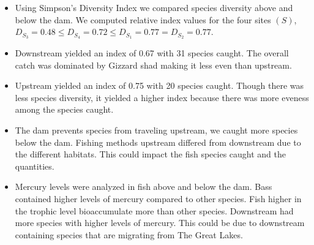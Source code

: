 \documentclass[b0paper,margin=1cm,landscape]{baposter}
\begin{document}
\begin{poster}
{  \begin{itemize} \normalsize 
    \item Using Simpson's Diversity Index we compared species diversity above and below the dam. 
    We computed relative index values for the four sites $(S)$,  $D_{S_{3}} = 0.48 \le D_{S_{4}} = 0.72 \le D_{S_{1}} = 0.77 = D_{S_{2}} = 0.77$. \\
    \item Downstream yielded an index of 0.67 with 31 species caught. 
    The overall catch was dominated by Gizzard shad making it less even than upstream.
    \item Upstream yielded an index of 0.75 with 20 species caught. 
    Though there was less species diversity, it yielded a higher index because there was more eveness among the species caught.   
    \item The dam prevents species from traveling upstream, we caught more species below the dam. 
    Fishing methods upstream differed from downstream due to the different habitats. 
    This could impact the fish species caught and the quantities.
    \item Mercury levels were analyzed in fish above and below the dam.
    Bass contained higher levels of mercury compared to other species. 
    Fish higher in the trophic level bioaccumulate more than other species. 
    Downstream had more species with higher levels of mercury. 
    This could be due to downstream containing species that are migrating from The Great Lakes.
  \end{itemize}
}


\end{poster}
\end{document}
